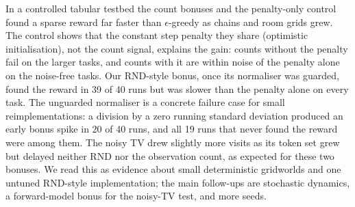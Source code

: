 In a controlled tabular testbed the count bonuses and the penalty-only control found a sparse reward far faster than $\epsilon$-greedy as chains and room grids grew. The control shows that the constant step penalty they share (optimistic initialisation), not the count signal, explains the gain: counts without the penalty fail on the larger tasks, and counts with it are within noise of the penalty alone on the noise-free tasks. Our RND-style bonus, once its normaliser was guarded, found the reward in 39 of 40 runs but was slower than the penalty alone on every task. The unguarded normaliser is a concrete failure case for small reimplementations: a division by a zero running standard deviation produced an early bonus spike in 20 of 40 runs, and all 19 runs that never found the reward were among them. The noisy TV drew slightly more visits as its token set grew but delayed neither RND nor the observation count, as expected for these two bonuses. We read this as evidence about small deterministic gridworlds and one untuned RND-style implementation; the main follow-ups are stochastic dynamics, a forward-model bonus for the noisy-TV test, and more seeds.
